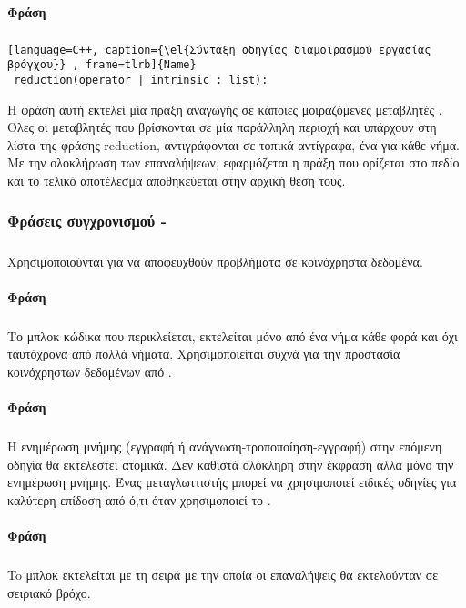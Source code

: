 \paragraph{Φράση }
\subparagraph{}    
\begin{lstlisting}[language=C++, caption={\el{Σύνταξη οδηγίας διαμοιρασμού εργασίας βρόγχου}} , frame=tlrb]{Name}
 reduction(operator | intrinsic : list):\end{lstlisting}
    

Η φράση αυτή εκτελεί μία πράξη αναγωγής σε κάποιες μοιραζόμενες μεταβλητές . Όλες οι μεταβλητές που βρίσκονται σε μία παράλληλη περιοχή και υπάρχουν στη λίστα της φράσης reduction, αντιγράφονται σε τοπικά αντίγραφα, ένα για κάθε νήμα. Με την ολοκλήρωση των επαναλήψεων, εφαρμόζεται η πράξη που ορίζεται στο πεδίο \emph{} και το τελικό αποτέλεσμα αποθηκεύεται στην αρχική θέση τους\cite{pdplab}.

\subsubsection{Φράσεις συγχρονισμού - }
\subparagraph{}
Χρησιμοποιούνται για να αποφευχθούν προβλήματα \emph{} σε κοινόχρηστα δεδομένα.

\paragraph{Φράση } 
\subparagraph{}
Το μπλοκ κώδικα που περικλείεται, εκτελείται μόνο από ένα νήμα κάθε φορά και όχι ταυτόχρονα από πολλά νήματα. Χρησιμοποιείται συχνά για την προστασία κοινόχρηστων δεδομένων από \emph{}.

\paragraph{Φράση }
\subparagraph{}
H ενημέρωση μνήμης (εγγραφή ή ανάγνωση-τροποποίηση-εγγραφή) στην επόμενη οδηγία θα εκτελεστεί ατομικά. Δεν καθιστά ολόκληρη στην έκφραση \emph{} αλλα μόνο την ενημέρωση μνήμης. Ένας μεταγλωττιστής μπορεί να χρησιμοποιεί ειδικές οδηγίες  για καλύτερη επίδοση από ό,τι όταν χρησιμοποιεί το .
      
      
\paragraph{Φράση }
\subparagraph{}
To μπλοκ εκτελείται με τη σειρά με την οποία οι επαναλήψεις θα εκτελούνταν σε σειριακό βρόχο.

